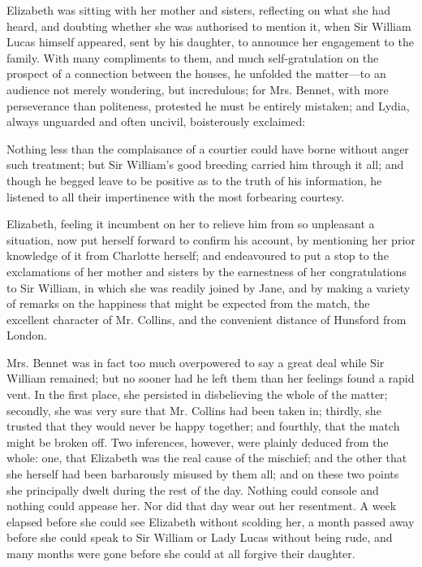 Elizabeth was sitting with her mother and sisters, reflecting on what she had heard, and doubting whether she was authorised to mention it, when Sir William Lucas himself appeared, sent by his daughter, to announce her engagement to the family. With many compliments to them, and much self-gratulation on the prospect of a connection between the houses, he unfolded the matter---to an audience not merely wondering, but incredulous; for Mrs. Bennet, with more perseverance than politeness, protested he must be entirely mistaken; and Lydia, always unguarded and often uncivil, boisterously exclaimed:


Nothing less than the complaisance of a courtier could have borne without anger such treatment; but Sir William's good breeding carried him through it all; and though he begged leave to be positive as to the truth of his information, he listened to all their impertinence with the most forbearing courtesy.

Elizabeth, feeling it incumbent on her to relieve him from so unpleasant a situation, now put herself forward to confirm his account, by mentioning her prior knowledge of it from Charlotte herself; and endeavoured to put a stop to the exclamations of her mother and sisters by the earnestness of her congratulations to Sir William, in which she was readily joined by Jane, and by making a variety of remarks on the happiness that might be expected from the match, the excellent character of Mr. Collins, and the convenient distance of Hunsford from London.

Mrs. Bennet was in fact too much overpowered to say a great deal while Sir William remained; but no sooner had he left them than her feelings found a rapid vent. In the first place, she persisted in disbelieving the whole of the matter; secondly, she was very sure that Mr. Collins had been taken in; thirdly, she trusted that they would never be happy together; and fourthly, that the match might be broken off. Two inferences, however, were plainly deduced from the whole: one, that Elizabeth was the real cause of the mischief; and the other that she herself had been barbarously misused by them all; and on these two points she principally dwelt during the rest of the day. Nothing could console and nothing could appease her. Nor did that day wear out her resentment. A week elapsed before she could see Elizabeth without scolding her, a month passed away before she could speak to Sir William or Lady Lucas without being rude, and many months were gone before she could at all forgive their daughter.

